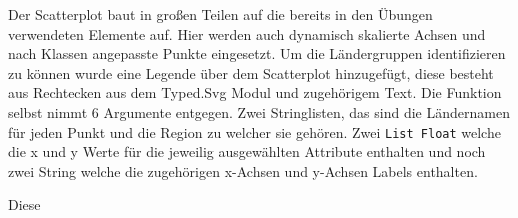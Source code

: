 Der Scatterplot baut in großen Teilen auf die bereits in den Übungen verwendeten Elemente auf. Hier werden auch dynamisch skalierte Achsen und nach Klassen angepasste Punkte eingesetzt. Um die Ländergruppen identifizieren zu können wurde eine Legende über dem Scatterplot hinzugefügt, diese besteht aus Rechtecken aus dem Typed.Svg Modul und zugehörigem Text. Die Funktion selbst nimmt 6 Argumente entgegen. Zwei Stringlisten, das sind die Ländernamen für jeden Punkt und die Region zu welcher sie gehören. Zwei \texttt{List Float} welche die x und y Werte für die jeweilig ausgewählten Attribute enthalten und noch zwei String welche die zugehörigen x-Achsen und y-Achsen Labels enthalten. 

Diese 